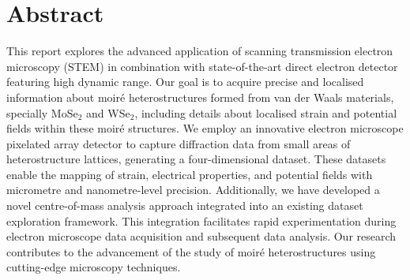\chapter*{Abstract}
%
This report explores the advanced application of scanning transmission electron microscopy (STEM) in combination with state-of-the-art direct electron detector featuring high dynamic range. Our goal is to acquire precise and localised information about moir\'e heterostructures formed from van der Waals materials, specially MoSe$_2$ and WSe$_2$, including details about localised strain and potential fields within these moir\'e structures. We employ an innovative electron microscope pixelated array detector to capture diffraction data from small areas of heterostructure lattices, generating a four-dimensional dataset. These datasets enable the mapping of strain, electrical properties, and potential fields with micrometre and nanometre-level precision. Additionally, we have developed a novel centre-of-mass analysis approach integrated into an existing dataset exploration framework. This integration facilitates rapid experimentation during electron microscope data acquisition and subsequent data analysis. Our research contributes to the advancement of the study of moir\'e heterostructures using cutting-edge microscopy techniques.